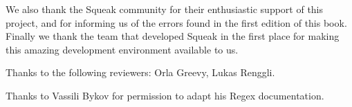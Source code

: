 \documentclass[a4paper,10pt,twoside]{book}
\begin{document}
We also thank the Squeak community for their enthusiastic support of this project, and for informing us of the errors found in the first edition of this book.
Finally we thank the team that developed Squeak in the first place for making this amazing development environment available to us.


Thanks to the following reviewers:
Orla Greevy,
Lukas Renggli.

Thanks to Vassili Bykov for permission to adapt his Regex documentation.


\ifx\wholebook\relax\else
   
   
\end{document}
